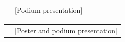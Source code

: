 \documentclass[11pt,letter,sans]{moderncv}
\makeatletter
\renewcommand*{\cvitem}[3][6pt]{%
	\begin{tabular}{@{}p{\hintscolumnwidth}@{\hspace{\separatorcolumnwidth}}p{\maincolumnwidth}@{}}%
		\raggedleft\hintstyle{#2} &{#3}%
	\end{tabular}%
	\par\addvspace{#1}}
\renewcommand*{\cvlistitem}[2][6pt]{%
	\cvitem[#1]{}{\listitemsymbol\begin{minipage}[t]{\listitemcolumnwidth}#2\end{minipage}}}
\let\oldsection\section%
\renewcommand{\section}[1]{\leavevmode\unskip\vspace*{-\baselineskip}\oldsection{#1}}%
\newcommand{\refno}[1]{}
\makeatother
\begin{document}
	\cvitem{2016\refno{UTCspotlight2016}}{\hspace{0em}\bibentry{UTCspotlight2016} [Podium presentation]}
	
	\cvitem{\refno{RSS2015}}{\hspace{0em}\bibentry{RSS2015} [Poster and podium presentation]}
	


\end{document}
